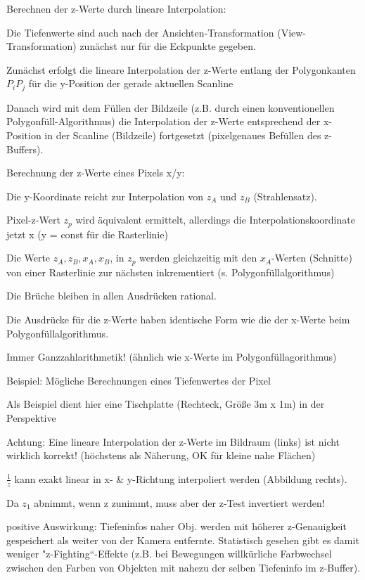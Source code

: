 \documentclass[landscape]{article}
\begin{document}
\begin{multicols}{3}
  Berechnen der z-Werte durch lineare Interpolation:
  \begin{itemize*}
    \item Die Tiefenwerte sind auch nach der Ansichten-Transformation (View-Transformation) zunächst nur für die Eckpunkte gegeben.
    \item Zunächst erfolgt die lineare Interpolation der z-Werte entlang der Polygonkanten $P_i P_j$ für die y-Position der gerade aktuellen Scanline
    \item Danach wird mit dem Füllen der Bildzeile (z.B. durch einen konventionellen Polygonfüll-Algorithmus) die Interpolation der z-Werte entsprechend der x-Position in der Scanline (Bildzeile) fortgesetzt (pixelgenaues Befüllen des z-Buffers).
  \end{itemize*}
  
  Berechnung der z-Werte eines Pixels x/y:
  \begin{itemize*}
    \item Die y-Koordinate reicht zur Interpolation von $z_A$ und $z_B$ (Strahlensatz).
    \item Pixel-z-Wert $z_p$ wird äquivalent ermittelt, allerdings die Interpolationskoordinate jetzt x (y = const für die Rasterlinie)
    \item Die Werte $z_A, z_B, x_A, x_B$, in $z_p$ werden gleichzeitig mit den $x_A$-Werten (Schnitte) von einer Rasterlinie zur nächsten inkrementiert (s. Polygonfüllalgorithmus)
    \item Die Brüche bleiben in allen Ausdrücken rational.
    \item Die Ausdrücke für die z-Werte haben identische Form wie die der x-Werte beim Polygonfüllalgorithmus.
  \end{itemize*}
  
  Immer Ganzzahlarithmetik! (ähnlich wie x-Werte im Polygonfüllagorithmus)
  
  Beispiel: Mögliche Berechnungen eines Tiefenwertes der Pixel
  \begin{itemize*}
    \item Als Beispiel dient hier eine Tischplatte (Rechteck, Größe 3m x 1m) in der Perspektive
    \item Achtung: Eine lineare Interpolation der z-Werte im Bildraum (links) ist nicht wirklich korrekt! (höchstens als Näherung, OK für kleine nahe Flächen)
    \item $\frac{1}{z}$ kann exakt linear in x- \& y-Richtung interpoliert werden (Abbildung rechts).
    \item Da $z_1$ abnimmt, wenn z zunimmt, muss aber der z-Test invertiert werden!
    \item positive Auswirkung: Tiefeninfos naher Obj. werden mit höherer z-Genauigkeit gespeichert als weiter von der Kamera entfernte. Statistisch gesehen gibt es damit weniger "z-Fighting“-Effekte (z.B. bei Bewegungen willkürliche Farbwechsel zwischen den Farben von Objekten mit nahezu der selben Tiefeninfo im z-Buffer).
  \end{itemize*}
  

\end{multicols}
\end{document}
